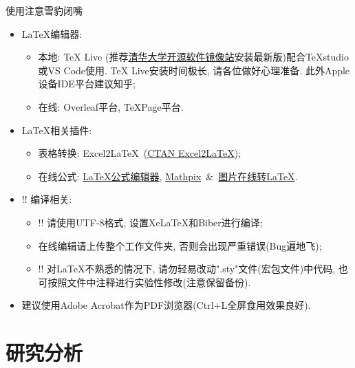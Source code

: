 \documentclass[hyperref, UTF8, CJK, aspectratio=169]{beamer}
\begin{document}
\begin{frame}{使用注意}{雪豹闭嘴}
	\begin{itemize}
		\item<1-> \LaTeX 编辑器:
		\begin{itemize}
			\item<1-> 本地: TeX Live (推荐\href{https://mirrors.tuna.tsinghua.edu.cn/CTAN/systems/texlive/Images/}{\color{scublue}清华大学开源软件镜像站}安装最新版)配合TeXstudio或VS Code使用. TeX Live安装时间极长, 请各位做好心理准备. 此外Apple设备IDE平台建议知乎;
			\item<1-> 在线: Overleaf平台, TeXPage平台.
		\end{itemize}
		\item<2-> \LaTeX 相关插件:
		\begin{itemize}
			\item<2-> 表格转换: Excel2\LaTeX~(\href{https://www.ctan.org/tex-archive/support/excel2latex/}{\color{scublue}CTAN Excel2\LaTeX});
			\item<2-> 在线公式: \href{https://www.latexlive.com/}{\color{scublue}LaTeX公式编辑器}, \href{https://mathpix.com/}{\color{scublue}
				Mathpix}~\&~\href{https://mathf.itewqq.cn/}{\color{scublue}图片在线转LaTeX}.
		\end{itemize}
		\item<3-> \color{scured}!! 编译相关:
		\begin{itemize}
			\item<3-> \alert{!! 请使用UTF-8格式, 设置XeLaTeX和Biber进行编译};
			\item<3-> 在线编辑请上传整个工作文件夹, 否则会出现严重错误(Bug遍地飞);
			\item<3-> \color{scured}!! 对\LaTeX 不熟悉的情况下, 请勿轻易改动".sty"文件(宏包文件)中代码, 也可按照文件中注释进行实验性修改(注意保留备份).
		\end{itemize}
		\item<4-> \color{scured} 建议使用Adobe Acrobat作为PDF浏览器(Ctrl+L全屏食用效果良好).
	\end{itemize}
\end{frame}

\section{研究分析}
\end{document}
